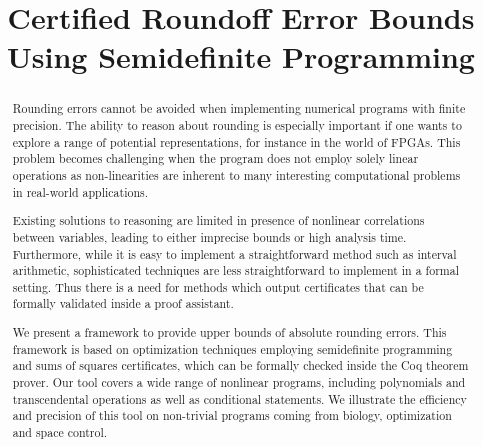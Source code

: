 \documentclass[preprint,fleqn,nocopyrightspace]{sigplanconf}
\theoremstyle{plain}
\begin{document}





\title{Certified Roundoff Error Bounds Using Semidefinite Programming}


\authorinfo{}{}{}

\maketitle

\begin{abstract}

Rounding errors cannot be avoided when implementing numerical programs with finite precision.         
The ability to reason about rounding is especially important if one wants to explore a range of potential representations, for instance in the world of FPGAs. This problem becomes challenging when the program does not employ solely linear operations as non-linearities are inherent to many interesting computational problems in real-world applications. 

Existing solutions to reasoning are limited in presence of nonlinear correlations between variables, leading to either imprecise bounds or high analysis time. Furthermore, while it is easy to implement a straightforward method such as interval arithmetic, sophisticated techniques are less straightforward to implement in a formal setting. Thus there is a need for methods which output certificates that can be formally  validated inside a proof assistant.

We present a framework to provide upper bounds of absolute rounding errors. This framework is based on optimization techniques employing  semidefinite programming and sums of squares certificates, which can be formally checked inside the Coq theorem prover.
Our tool covers a wide range of nonlinear programs, including polynomials and transcendental operations as well as conditional statements.                                                             We illustrate the efficiency and  precision of this tool on non-trivial programs coming from biology, optimization and space control.
\end{abstract}
\end{document}
